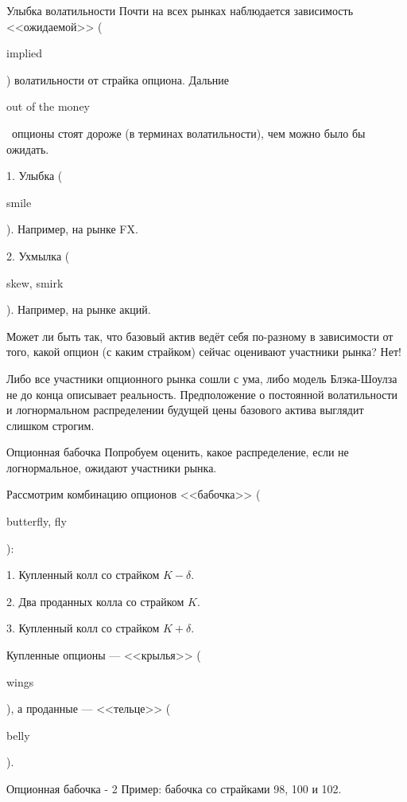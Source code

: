 \documentclass{beamer}
\newcommand{\en}[1]{\begin{otherlanguage}{english}#1\end{otherlanguage}}
\begin{document}
\begin{frame}{Улыбка волатильности}
\justify
Почти на всех рынках наблюдается зависимость <<ожидаемой>> (\en{implied}) волатильности от страйка опциона. Дальние \en{out of the money}\ опционы стоят дороже (в терминах волатильности), чем можно было бы ожидать.

1. Улыбка (\en{smile}). Например, на рынке FX.

2. Ухмылка (\en{skew, smirk}). Например, на рынке акций.

\justify
Может ли быть так, что базовый актив ведёт себя по-разному в зависимости от того, какой опцион (с каким страйком) сейчас оценивают участники рынка? Нет!

\justify
Либо все участники опционного рынка сошли с ума, либо модель Блэка-Шоулза не до конца описывает реальность. Предположение о постоянной волатильности и логнормальном распределении будущей цены базового актива выглядит слишком строгим.
\end{frame}



\begin{frame}{Опционная бабочка}
\justify
Попробуем оценить, какое распределение, если не логнормальное, ожидают участники рынка.

\justify
Рассмотрим комбинацию опционов <<бабочка>> (\en{butterfly, fly}):

1. Купленный колл со страйком $K - \delta$.

2. Два проданных колла со страйком $K$.

3. Купленный колл со страйком $K + \delta$.

\justify
Купленные опционы --- <<крылья>> (\en{wings}), а проданные --- <<тельце>> (\en{belly}).
\end{frame}



\begin{frame}{Опционная бабочка - 2}
\justify
Пример: бабочка со страйками 98, 100 и 102.

\centering
\end{frame}
\end{document}
